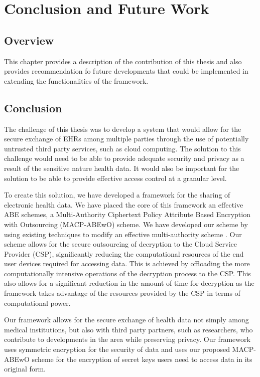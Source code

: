 \chapter{Conclusion and Future Work}
\label{chap:conclusions}

\section{Overview}

This chapter provides a description of the contribution of this thesis and also provides recommendation fo future developments that could be implemented in extending the functionalities of the framework.

\section{Conclusion}

The challenge of this thesis was to develop a system that would allow for the secure exchange of EHRs among  multiple parties through the use of potentially untrusted third party services, such as cloud computing. The solution to this challenge would need to be able to provide adequate security and privacy as a result of the sensitive nature health data. It would also be important for the solution to be able to provide effective access control at a granular level. 

To create this solution, we have developed a framework for the sharing of electronic health data. We have placed the core of this framework an effective ABE schemes, a Multi-Authority Ciphertext Policy Attribute Based Encryption with Outsourcing (MACP-ABEwO) scheme. We have developed our scheme by using existing techniques to modify an effective multi-authority scheme \cite{Yang2014}. Our scheme allows for the secure outsourcing of decryption to the Cloud Service Provider (CSP), significantly reducing the computational resources of the end user devices required for accessing data. This is achieved by offloading the more computationally intensive operations of the decryption process to the CSP. This also allows for a significant reduction in the amount of time for decryption as the framework takes advantage of the resources provided by the CSP in terms of computational power.

Our framework allows for the secure exchange of health data not simply among medical institutions, but also with third party partners, such as researchers, who contribute to developments in the area while preserving privacy. Our framework uses symmetric encryption for the security of data and uses our proposed MACP-ABEwO scheme for the encryption of secret keys users need to access data in its original form.

